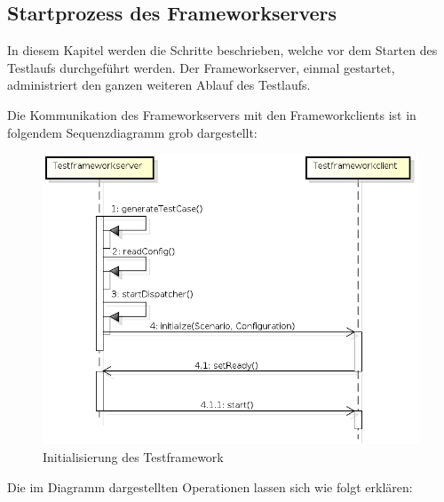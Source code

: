 \subsection{Startprozess des Frameworkservers}
\label{sec:startFramework}
In diesem Kapitel werden die Schritte beschrieben, welche vor dem Starten des Testlaufs durchgeführt werden. Der Frameworkserver, einmal gestartet, administriert den ganzen weiteren Ablauf des Testlaufs. 

Die Kommunikation des Frameworkservers mit den Frameworkclients ist in folgendem Sequenzdiagramm grob dargestellt:

\begin{figure}[H]
\begin{center}
\includegraphics[scale=0.7]{image_testFramework/TestFWInit.png}
\end{center}
\caption{Initialisierung des Testframework}
\end{figure}

Die im Diagramm dargestellten Operationen lassen sich wie folgt erklären:

